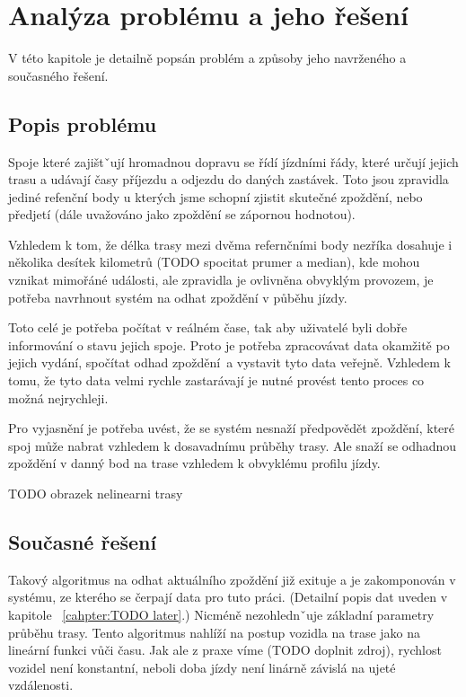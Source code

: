 
\chapter{Analýza problému a jeho řešení}

V této kapitole je detailně popsán problém a způsoby jeho navrženého a současného řešení.

\section{Popis problému}

Spoje které zajištˇují hromadnou dopravu se řídí jízdními řády, které určují jejich trasu a udávají časy příjezdu a odjezdu do daných zastávek. Toto jsou zpravidla jediné refenční body u kterých jsme schopní zjistit skutečné zpoždění, nebo předjetí (dále uvažováno jako zpoždění se zápornou hodnotou).

\bigbreak

Vzhledem k tom, že délka trasy mezi dvěma refernčními body nezříka dosahuje i několika desítek kilometrů (TODO spocitat prumer a median), kde mohou vznikat mimořáné události, ale zpravidla je ovlivněna obvyklým provozem, je potřeba navrhnout systém na odhat zpoždění v půběhu jízdy.

\bigbreak

Toto celé je potřeba počítat v reálném čase, tak aby uživatelé byli dobře informování o stavu jejich spoje. Proto je potřeba zpracovávat data okamžitě po jejich vydání, spočítat odhad zpoždění a vystavit tyto data veřejně. Vzhledem k tomu, že tyto data velmi rychle zastarávají je nutné provést tento proces co možná nejrychleji.

\bigbreak

Pro vyjasnění je potřeba uvést, že se systém nesnaží předpovědět zpoždění, které spoj může nabrat vzhledem k dosavadnímu průběhy trasy. Ale snaží se odhadnou zpoždění v danný bod na trase vzhledem k obvyklému profilu jízdy.

TODO obrazek nelinearni trasy

\section{Současné řešení}

Takový algoritmus na odhat aktuálního zpoždění již exituje a je zakomponován v systému, ze kterého se čerpají data pro tuto práci. (Detailní popis dat uveden v kapitole ~\ref{cahpter:TODO later}.) Nicméně nezohlednˇuje základní parametry průběhu trasy. Tento algoritmus nahlíží na postup vozidla na trase jako na lineární funkci vůči času. Jak ale z praxe víme (TODO doplnit zdroj), rychlost vozidel není konstantní, neboli doba jízdy není linárně závislá na ujeté vzdálenosti.

